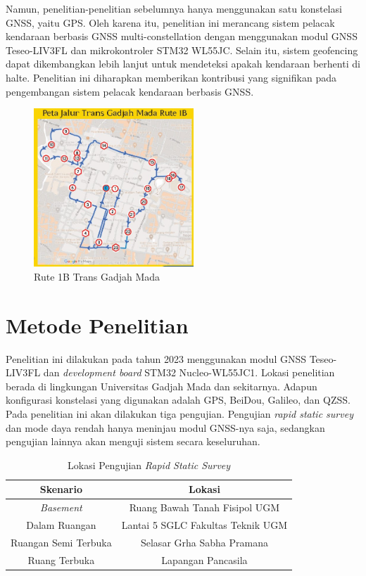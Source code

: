\documentclass[conference]{IEEEtran}
\begin{document}
Namun, penelitian-penelitian sebelumnya hanya menggunakan satu konstelasi GNSS, yaitu GPS. Oleh karena itu, penelitian ini merancang sistem pelacak kendaraan berbasis GNSS multi-constellation dengan menggunakan modul GNSS Teseo-LIV3FL dan mikrokontroler STM32 WL55JC. Selain itu, sistem geofencing dapat dikembangkan lebih lanjut untuk mendeteksi apakah kendaraan berhenti di halte. Penelitian ini diharapkan memberikan kontribusi yang signifikan pada pengembangan sistem pelacak kendaraan berbasis GNSS.

\begin{figure}[H]
	\centering
	\includegraphics[width=6cm]{Peta-Jalur-Rute-1B.jpg}
	\caption{Rute 1B Trans Gadjah Mada}
	\label{Fig: tgm-1b}
\end{figure}

\section{Metode Penelitian}
Penelitian ini dilakukan pada tahun 2023 menggunakan modul GNSS Teseo-LIV3FL dan \textit{development board} STM32 Nucleo-WL55JC1. Lokasi penelitian berada di lingkungan Universitas Gadjah Mada dan sekitarnya. Adapun konfigurasi konstelasi yang digunakan adalah GPS, BeiDou, Galileo, dan QZSS. Pada penelitian ini akan dilakukan tiga pengujian. Pengujian \textit{rapid static survey} dan mode daya rendah hanya meninjau modul GNSS-nya saja, sedangkan pengujian lainnya akan menguji sistem secara keseluruhan.

\begin{table}[htb!]
	\caption{Lokasi Pengujian \textit{Rapid Static Survey}}
	\centering
	\renewcommand{\arraystretch}{1.5}
	\begin{tabular}{cc}
		\hline
		\textbf{Skenario} & \textbf{Lokasi} \\\hline
		\textit{Basement} &Ruang Bawah Tanah Fisipol UGM\\
		Dalam Ruangan & Lantai 5 SGLC Fakultas Teknik UGM\\
		Ruangan Semi Terbuka &  Selasar Grha Sabha Pramana\\
		Ruang Terbuka & Lapangan Pancasila\\
		\hline
	\end{tabular}
	\label{tab: 3-rss-location}
\end{table}
\end{document}
